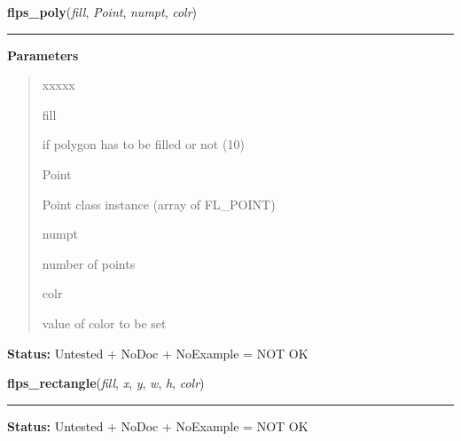 \hspace{.8\funcindent}\begin{boxedminipage}{\funcwidth}

    \raggedright \textbf{flps\_poly}(\textit{fill}, \textit{Point}, \textit{numpt}, \textit{colr})

    \vspace{-1.5ex}

    \rule{\textwidth}{0.5\fboxrule}
\setlength{\parskip}{2ex}
\setlength{\parskip}{1ex}
      \textbf{Parameters}
      \vspace{-1ex}

      \begin{quote}
        \begin{Ventry}{xxxxx}

          \item[fill]

          if polygon has to be filled or not (1{\textbar}0)

          \item[Point]

          Point class instance (array of FL\_POINT)

          \item[numpt]

          number of points

          \item[colr]

          value of color to be set

        \end{Ventry}

      \end{quote}

\textbf{Status:} Untested + NoDoc + NoExample = NOT OK



    \end{boxedminipage}

    \label{xformslib:library:flps_rectangle}

    \vspace{0.5ex}

\hspace{.8\funcindent}\begin{boxedminipage}{\funcwidth}

    \raggedright \textbf{flps\_rectangle}(\textit{fill}, \textit{x}, \textit{y}, \textit{w}, \textit{h}, \textit{colr})

    \vspace{-1.5ex}

    \rule{\textwidth}{0.5\fboxrule}
\setlength{\parskip}{2ex}
\setlength{\parskip}{1ex}
\textbf{Status:} Untested + NoDoc + NoExample = NOT OK



    \end{boxedminipage}


